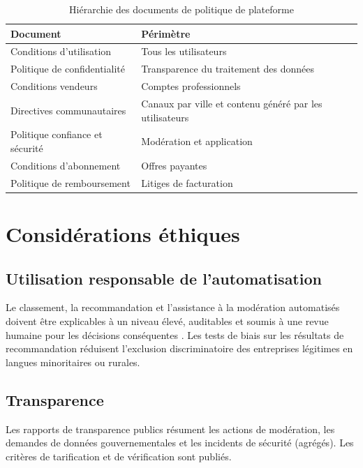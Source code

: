 \begin{table}[H]
  \centering
  \caption{Hiérarchie des documents de politique de plateforme}
  \label{tab:policy-hierarchy}
  \begin{tabularx}{\textwidth}{@{}lX@{}}
    \toprule
    \textbf{Document} & \textbf{Périmètre} \\
    \midrule
    Conditions d'utilisation & Tous les utilisateurs \\
    Politique de confidentialité & Transparence du traitement des données \\
    Conditions vendeurs & Comptes professionnels \\
    Directives communautaires & Canaux par ville et contenu généré par les utilisateurs \\
    Politique confiance et sécurité & Modération et application \\
    Conditions d'abonnement & Offres payantes \\
    Politique de remboursement & Litiges de facturation \\
    \bottomrule
  \end{tabularx}
\end{table}

\section{Considérations éthiques}

\subsection{Utilisation responsable de l'automatisation}

Le classement, la recommandation et l'assistance à la modération automatisés doivent être explicables à un niveau élevé, auditables et soumis à une revue humaine pour les décisions conséquentes \parencite{euAIAct2024}. Les tests de biais sur les résultats de recommandation réduisent l'exclusion discriminatoire des entreprises légitimes en langues minoritaires ou rurales.

\subsection{Transparence}

Les rapports de transparence publics résument les actions de modération, les demandes de données gouvernementales et les incidents de sécurité (agrégés). Les critères de tarification et de vérification sont publiés.

